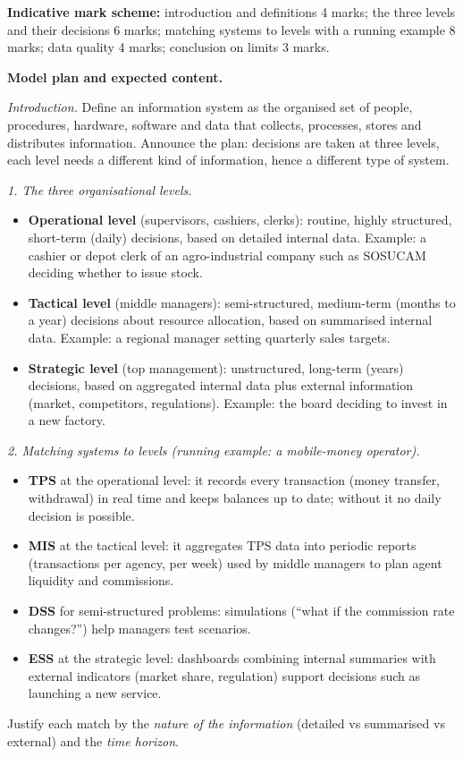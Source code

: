 \documentclass[11pt]{article}
\begin{document}
\begin{corrige}
\textbf{Indicative mark scheme:} introduction and definitions 4 marks; the three levels and their decisions 6 marks; matching systems to levels with a running example 8 marks; data quality 4 marks; conclusion on limits 3 marks.

\textbf{Model plan and expected content.}

\emph{Introduction.} Define an information system as the organised set of people, procedures, hardware, software and data that collects, processes, stores and distributes information. Announce the plan: decisions are taken at three levels, each level needs a different kind of information, hence a different type of system.

\emph{1. The three organisational levels.}
\begin{itemize}
\item \textbf{Operational level} (supervisors, cashiers, clerks): routine, highly structured, short-term (daily) decisions, based on detailed internal data. Example: a cashier or depot clerk of an agro-industrial company such as SOSUCAM deciding whether to issue stock.
\item \textbf{Tactical level} (middle managers): semi-structured, medium-term (months to a year) decisions about resource allocation, based on summarised internal data. Example: a regional manager setting quarterly sales targets.
\item \textbf{Strategic level} (top management): unstructured, long-term (years) decisions, based on aggregated internal data plus external information (market, competitors, regulations). Example: the board deciding to invest in a new factory.
\end{itemize}

\emph{2. Matching systems to levels (running example: a mobile-money operator).}
\begin{itemize}
\item \textbf{TPS} at the operational level: it records every transaction (money transfer, withdrawal) in real time and keeps balances up to date; without it no daily decision is possible.
\item \textbf{MIS} at the tactical level: it aggregates TPS data into periodic reports (transactions per agency, per week) used by middle managers to plan agent liquidity and commissions.
\item \textbf{DSS} for semi-structured problems: simulations (``what if the commission rate changes?'') help managers test scenarios.
\item \textbf{ESS} at the strategic level: dashboards combining internal summaries with external indicators (market share, regulation) support decisions such as launching a new service.
\end{itemize}
Justify each match by the \emph{nature of the information} (detailed vs summarised vs external) and the \emph{time horizon}.


\end{corrige}
\end{document}
